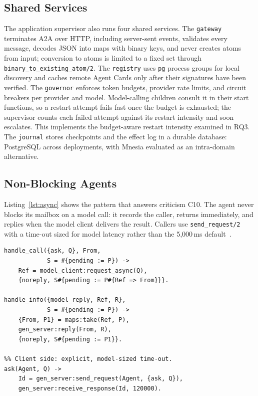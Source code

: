 \documentclass[conference,letterpaper]{IEEEtran}
\newcommand{\code}[1]{\texttt{#1}}
\begin{document}
\subsection{Shared Services}

The application supervisor also runs four shared services. The
\code{gateway} terminates A2A over HTTP, including server-sent events,
validates every message, decodes JSON into maps with binary keys, and never
creates atoms from input; conversion to atoms is limited to a fixed set
through \code{binary\_to\_existing\_atom/2}. The \code{registry} uses
\code{pg} process groups for local discovery and caches remote Agent Cards
only after their signatures have been verified. The \code{governor} enforces
token budgets, provider rate limits, and circuit breakers per provider and
model. Model-calling children consult it in their start functions, so a
restart attempt fails fast once the budget is exhausted; the supervisor
counts each failed attempt against its restart intensity and soon escalates.
This implements the budget-aware restart intensity examined in RQ3. The
\code{journal} stores checkpoints and the effect log in a durable database:
PostgreSQL across deployments, with Mnesia evaluated as an intra-domain
alternative.

\subsection{Non-Blocking Agents}

Listing~\ref{lst:async} shows the pattern that answers criticism C10. The
agent never blocks its mailbox on a model call: it records the caller,
returns immediately, and replies when the model client delivers the result.
Callers use \code{send\_request/2} with a time-out sized for model latency
rather than the 5{,}000\,ms default~\cite{otp-genserver}.

\begin{lstlisting}[float=t, caption={Deferred replies keep an agent's
mailbox responsive during slow model calls.}, label={lst:async}]
%% Server side: never block the mailbox.
handle_call({ask, Q}, From,
            S = #{pending := P}) ->
    Ref = model_client:request_async(Q),
    {noreply, S#{pending := P#{Ref => From}}}.

handle_info({model_reply, Ref, R},
            S = #{pending := P}) ->
    {From, P1} = maps:take(Ref, P),
    gen_server:reply(From, R),
    {noreply, S#{pending := P1}}.

%% Client side: explicit, model-sized time-out.
ask(Agent, Q) ->
    Id = gen_server:send_request(Agent, {ask, Q}),
    gen_server:receive_response(Id, 120000).
\end{lstlisting}
\end{document}
